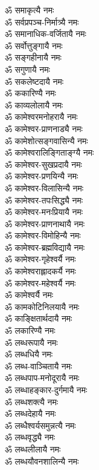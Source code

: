 \begin{multicols}{2}
\begin{flushleft}
ॐ समाकृत्यै नमः\\
ॐ सर्वप्रपञ्च-निर्मात्र्यै नमः\\
ॐ समानाधिक-वर्जितायै नमः\\
ॐ सर्वोत्तुङ्गायै नमः\\
ॐ सङ्गहीनायै नमः\\
ॐ सगुणायै नमः\\
ॐ सकलेष्टदायै नमः\hfill {}\\
ॐ ककारिण्यै नमः\\
ॐ काव्यलोलायै नमः\\
ॐ कामेश्वरमनोहरायै नमः\\
ॐ कामेश्वर-प्राणनाड्यै नमः\\
ॐ कामेशोत्सङ्गवासिन्यै नमः\\
ॐ कामेश्वरालिङ्गिताङ्ग्यै नमः\\
ॐ कामेश्वर-सुखप्रदायै नमः\\
ॐ कामेश्वर-प्रणयिन्यै नमः\\
ॐ कामेश्वर-विलासिन्यै नमः\\
ॐ कामेश्वर-तपःसिद्ध्यै नमः\hfill {}\\
ॐ कामेश्वर-मनःप्रियायै नमः\\
ॐ कामेश्वर-प्राणनाथायै नमः\\
ॐ कामेश्वर-विमोहिन्यै नमः\\
ॐ कामेश्वर-ब्रह्मविद्यायै नमः\\
ॐ कामेश्वर-गृहेश्वर्यै नमः\\
ॐ कामेश्वराह्लादकर्यै नमः\\
ॐ कामेश्वर-महेश्वर्यै नमः\\
ॐ कामेश्वर्यै नमः\\
ॐ कामकोटिनिलयायै नमः\\
ॐ काङ्क्षितार्थदायै नमः\hfill {}\\
ॐ लकारिण्यै नमः\\
ॐ लब्धरूपायै नमः\\
ॐ लब्धधियै नमः\\
ॐ लब्ध-वाञ्चितायै नमः\\
ॐ लब्धपाप-मनोदूरायै नमः\\
ॐ लब्धाहङ्कार-दुर्गमायै नमः\\
ॐ लब्धशक्त्यै नमः\\
ॐ लब्धदेहायै नमः\\
ॐ लब्धैश्वर्यसमुन्नत्यै नमः\\
ॐ लब्धवृद्ध्यै नमः\hfill {}\\
ॐ लब्धलीलायै नमः\\
ॐ लब्धयौवनशालिन्यै नमः\\

\end{flushleft}
\end{multicols}
